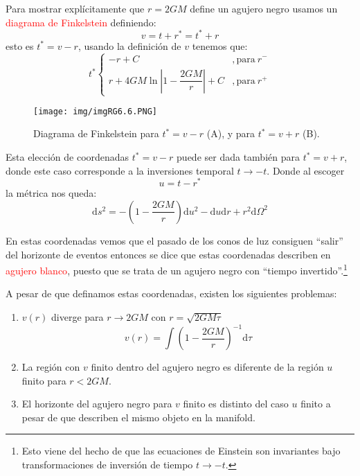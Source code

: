 \documentclass[../main]{subfiles}
\begin{document}
Para mostrar explícitamente que $r=2GM$ define un agujero negro usamos un \textcolor{red}{diagrama de Finkelstein} definiendo:
\begin{equation}
    v=t+r^*=t^*+r
\end{equation}
esto es $t^*=v-r$, usando la definición de $v$ tenemos que:
\begin{equation}
    t^*\left\{
    \begin{array}{cc}
        -r+C &, \text{para} \ r^-\\
        r+4GM\ln\left|1-\dfrac{2GM}{r}\right|+C &, \text{para} \ r^+
    \end{array}
    \right.
\end{equation}
\begin{figure}[h]
    \begin{center}
        \texttt{[image: img/imgRG6.6.PNG]}
    \end{center}
    \caption{Diagrama de Finkelstein para $t^*=v-r$ (A), y para $t^*=v+r$ (B).}
\end{figure}
Esta elección de coordenadas $t^*=v-r$ puede ser dada también para $t^*=v+r$, donde este caso corresponde a la inversiones temporal $t\rightarrow -t$. Donde al escoger
\begin{equation}
    u=t-r^*
\end{equation}
la métrica nos queda:
\begin{equation}
    \mathrm{d}s^2=-\left(1-\dfrac{2GM}{r}\right)\mathrm{d}u^2-\mathrm{d}u\mathrm{d}r+r^2\mathrm{d}\Omega^2
\end{equation}

En estas coordenadas vemos que el pasado de los conos de luz consiguen ``salir'' del horizonte de eventos entonces se dice que estas coordenadas describen en \textcolor{red}{agujero blanco}, puesto que se trata de un agujero negro con ``tiempo invertido''.\footnote{Esto viene del hecho de que las ecuaciones de Einstein son invariantes bajo transformaciones de inversión de tiempo $t\rightarrow -t$.}

A pesar de que definamos estas coordenadas, existen los siguientes problemas:
\begin{enumerate}
    \item $v(r)$ diverge para $r\rightarrow 2GM$ con $r=\sqrt{2GM\tau}$
    \begin{equation}
        v(r)=\int \left(1-\dfrac{2GM}{r}\right)^{-1}\mathrm{d}\tau
    \end{equation}
    \item La región con $v$ finito dentro del agujero negro es diferente de la región $u$ finito para $r<2GM$.
    \item El horizonte del agujero negro para $v$ finito es distinto del caso $u$ finito a pesar de que describen el mismo objeto en la manifold.
\end{enumerate}
\end{document}
